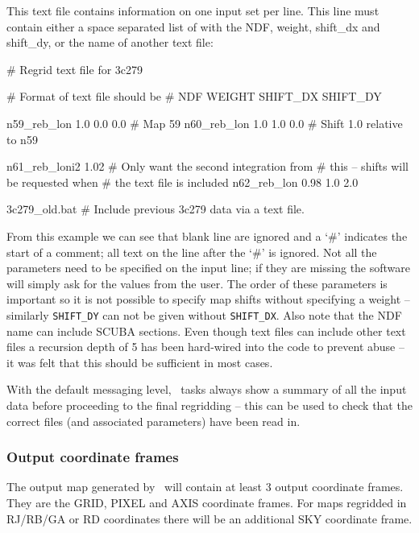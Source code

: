 \documentclass[twoside,11pt]{starlink}
\providecommand{\task}[1]{#1}
\providecommand{\param}[1]{\texttt{#1}}
\providecommand{\rebin}{\htmlref{\task{rebin}}{REBIN}}
\begin{document}
This text file contains information on one input set per line. This line
must contain either a space separated list of with the NDF, weight, shift\_dx
and shift\_dy, or the name of another text file:

\begin{terminalv}
# Regrid text file for 3c279

# Format of text file should be
#  NDF     WEIGHT     SHIFT_DX    SHIFT_DY

n59_reb_lon  1.0   0.0   0.0    # Map 59
n60_reb_lon  1.0   1.0   0.0    # Shift 1.0 relative to n59

n61_reb_lon{i2} 1.02            # Only want the second integration from
                                # this -- shifts will be requested when
                                # the text file is included
n62_reb_lon   0.98 1.0   2.0

3c279_old.bat                   # Include previous 3c279 data via a text file.
\end{terminalv}

From this example we can see that blank line are ignored and a `\#' indicates
the start of a comment; all text on the line after the `\#' is ignored. Not
all the parameters need to be specified on the input line; if they are missing
the software will simply ask for the values from the user. The order of these
parameters is important so it is not possible to specify map shifts without
specifying a weight -- similarly \param{SHIFT\_DY} can not be given without
\param{SHIFT\_DX}. Also note that the NDF name can include SCUBA sections.
Even though text files can include other text files a recursion depth of 5 has
been hard-wired into the code to prevent abuse -- it was felt that this should
be sufficient in most cases.

With the default messaging level, \rebin\ tasks always show a summary
of all the input data before proceeding to the final regridding -- this
can be used to check that the correct files (and associated parameters)
have been read in.

\subsubsection{Output coordinate frames}

The output map generated by \rebin\ will contain at least 3 output
coordinate frames. They are the GRID, PIXEL and AXIS coordinate
frames. For maps regridded in RJ/RB/GA or RD coordinates there will be an
additional SKY coordinate frame.
\end{document}
